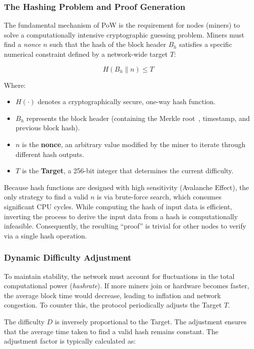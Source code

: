 \subsubsection{The Hashing Problem and Proof Generation}
The fundamental mechanism of PoW is the requirement for nodes (miners) to solve a computationally intensive cryptographic guessing problem. Miners must find a \textit{nonce} $n$ such that the hash of the block header $B_h$ satisfies a specific numerical constraint defined by a network-wide target $T$:

\begin{equation}
    H(B_h \parallel n) \leq T
\end{equation}

Where:
\begin{itemize}
    \item $H(\cdot)$ denotes a cryptographically secure, one-way hash function.
    \item $B_h$ represents the block header (containing the Merkle root~\cite{merkleTrees}, timestamp, and previous block hash).
    \item $n$ is the \textbf{nonce}, an arbitrary value modified by the miner to iterate through different hash outputs.
    \item $T$ is the \textbf{Target}, a 256-bit integer that determines the current difficulty.
\end{itemize}


Because hash functions are designed with high sensitivity (Avalanche Effect), the only strategy to find a valid $n$ is via brute-force search, which consumes significant CPU cycles. While computing the hash of input data is efficient, inverting the process to derive the input data from a hash is computationally infeasible. Consequently, the resulting “proof” is trivial for other nodes to verify via a single hash operation.

\subsubsection{Dynamic Difficulty Adjustment} \label{ch2_dynamic_difficulty_adjustment}
To maintain stability, the network must account for fluctuations in the total computational power (\textit{hashrate}). If more miners join or hardware becomes faster, the average block time would decrease, leading to inflation and network congestion. To counter this, the protocol periodically adjusts the Target $T$.

The difficulty $D$ is inversely proportional to the Target. The adjustment ensures that the average time taken to find a valid hash remains constant. The adjustment factor is typically calculated as:

